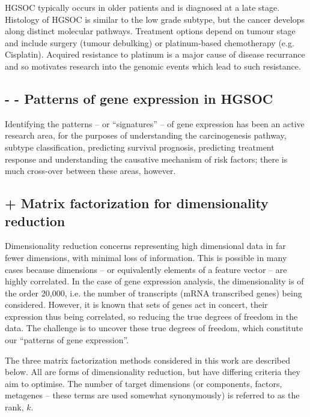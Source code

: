 \documentclass[tikz, 11pt,a4paper,oneside,fleqn, draft]{article}
\begin{document}
HGSOC typically occurs in older patients and is diagnosed at a late stage.   Histology of HGSOC is similar to the low grade subtype, but the cancer develops along distinct molecular pathways. 
Treatment options depend on tumour stage and include surgery (tumour debulking) or platinum-based chemotherapy (e.g. Cisplatin).  Acquired resistance to platinum is a major cause of disease recurrance\cite{Patch2015} and so motivates research into the genomic events which lead to such resistance.


\subsection{- - Patterns of gene expression in HGSOC}
\label{sec-review-of-gene-expression}
Identifying the patterns -- or ``signatures'' -- of gene expression has been an active research area, for the purposes of understanding the carcinogenesis pathway, subtype classification, predicting survival prognosis, predicting treatment response and understanding the causative mechanism of risk factors; there is much cross-over between these areas, however.



\subsection{+ Matrix factorization for dimensionality reduction}
\label{sec-matrix-factorization-intro}

Dimensionality reduction concerns representing high dimensional data in far fewer dimensions, with minimal loss of information.  This is possible in many cases because dimensions -- or equivalently elements of a feature vector -- are highly correlated.  In the case of gene expression analysis, the dimensionality is of the order 20,000, i.e. the number of transcripts (mRNA transcribed genes) being considered.  However, it is known that sets of genes act in concert, their expression thus being correlated, so reducing the true degrees of freedom in the data.  The challenge is to uncover these true degrees of freedom, which constitute our ``patterns of gene expression''.

The three matrix factorization methods considered in this work are described below.  All are forms of dimensionality reduction, but have differing criteria they aim to optimise.  The number of target dimensions (or components, factors, metagenes -- these terms are used somewhat synonymously) is referred to as the rank, $k$.
\end{document}
